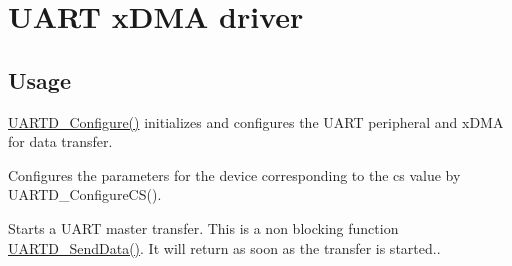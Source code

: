\hypertarget{group__uart__dma__module}{}\section{U\+A\+RT x\+D\+MA driver}
\label{group__uart__dma__module}
\hypertarget{group__RTEMSBSPsARM_Usage}{}\subsection{Usage}\label{group__RTEMSBSPsARM_Usage}

\begin{DoxyItemize}
\item \mbox{\hyperlink{uart__dma_8c_a8b463d15a44a1b7058c8d1f259c84fcf}{U\+A\+R\+T\+D\+\_\+\+Configure()}} initializes and configures the U\+A\+RT peripheral and x\+D\+MA for data transfer. 
\item Configures the parameters for the device corresponding to the cs value by U\+A\+R\+T\+D\+\_\+\+Configure\+C\+S().  
\item Starts a U\+A\+RT master transfer. This is a non blocking function \mbox{\hyperlink{uart__dma_8c_a649abc6e6061e5cbe6450fbba03aa025}{U\+A\+R\+T\+D\+\_\+\+Send\+Data()}}. It will return as soon as the transfer is started.. 
\end{DoxyItemize}